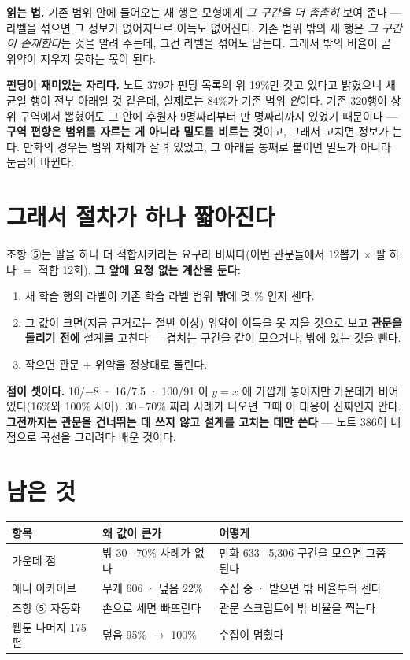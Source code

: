 \documentclass[11pt]{article}
\begin{document}
\textbf{읽는 법.} 기존 범위 안에 들어오는 새 행은 모형에게 \emph{그 구간을
더 촘촘히} 보여 준다 --- 라벨을 섞으면 그 정보가 없어지므로 이득도 없어진다.
기존 범위 밖의 새 행은 \emph{그 구간이 존재한다}는 것을 알려 주는데, 그건
라벨을 섞어도 남는다. 그래서 밖의 비율이 곧 위약이 지우지 못하는 몫이 된다.

\textbf{펀딩이 재미있는 자리다.} 노트 379가 펀딩 목록의 위 19\%만 갖고
있다고 밝혔으니 새 균일 행이 전부 아래일 것 같은데, 실제로는 84\%가 기존
범위 \emph{안}이다. 기존 320행이 상위 구역에서 뽑혔어도 그 안에 후원자
9명짜리부터 만 명짜리까지 있었기 때문이다 --- \textbf{구역 편향은 범위를
자르는 게 아니라 밀도를 비트는 것}이고, 그래서 고치면 정보가 는다.
만화의 경우는 범위 자체가 잘려 있었고, 그 아래를 통째로 붙이면 밀도가
아니라 눈금이 바뀐다.

\section{그래서 절차가 하나 짧아진다}

조항 ⑤는 팔을 하나 더 적합시키라는 요구라 비싸다(이번 관문들에서 12뽑기
$\times$ 팔 하나 $=$ 적합 12회). \textbf{그 앞에 요청 없는 계산을 둔다:}

\begin{enumerate}
\item 새 학습 행의 라벨이 기존 학습 라벨 범위 \textbf{밖}에 몇 \% 인지 센다.
\item 그 값이 크면(지금 근거로는 절반 이상) 위약이 이득을 못 지울 것으로
보고 \textbf{관문을 돌리기 전에} 설계를 고친다 --- 겹치는 구간을 같이
모으거나, 밖에 있는 것을 뺀다.
\item 작으면 관문 $+$ 위약을 정상대로 돌린다.
\end{enumerate}

\textbf{점이 셋이다.} 10/$-8$ · 16/7.5 · 100/91 이 $y=x$ 에 가깝게 놓이지만
가운데가 비어 있다(16\%와 100\% 사이). 30\,--\,70\% 짜리 사례가 나오면
그때 이 대응이 진짜인지 안다. \textbf{그전까지는 관문을 건너뛰는 데 쓰지
않고 설계를 고치는 데만 쓴다} --- 노트 386이 네 점으로 곡선을 그리려다
배운 것이다.

\section{남은 것}

\begin{center}
\begin{tabular}{lll}
\hline
항목 & 왜 값이 큰가 & 어떻게 \\
\hline
가운데 점 & 밖 30\,--\,70\% 사례가 없다 & 만화 633\,--\,5,306 구간을 모으면 그쯤 된다 \\
애니 아카이브 & 무게 606 · 덮음 22\% & 수집 중 · 받으면 밖 비율부터 센다 \\
조항 ⑤ 자동화 & 손으로 세면 빠뜨린다 & 관문 스크립트에 밖 비율을 찍는다 \\
웹툰 나머지 175편 & 덮음 95\% $\to$ 100\% & 수집이 멈췄다 \\
\hline
\end{tabular}
\end{center}
\end{document}
